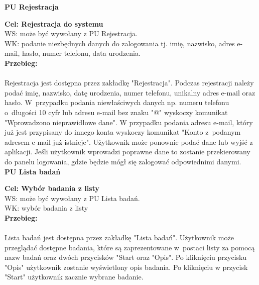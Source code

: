 \documentclass[12pt, letterpaper]{article}
\begin{document}
		
		\textbf{PU Rejestracja}
		
		\quad
		
		\textbf{Cel: Rejestracja do systemu}\\
		
		WS: może być wywołany z PU Rejestracja.\\
		
		WK: podanie niezbędnych danych do zalogowania tj. imię, nazwisko, adres e-mail, hasło, numer telefonu, data urodzenia.\\
		
		\textbf{Przebieg:}
\paragraph{}Rejestracja jest dostępna przez zakładkę "Rejestracja". Podczas rejestracji należy podać imię, nazwisko, datę urodzenia, numer telefonu, unikalny adres e-mail oraz hasło. W~przypadku podania niewłaściwych danych np. numeru telefonu o~długości 10 cyfr lub adresu e-mail bez znaku "@" wyskoczy komunikat "Wprowadzono nieprawidłowe dane". W przypadku podania adresu e-mail, który już jest przypisany do innego konta wyskoczy komunikat "Konto z~podanym adresem e-mail już istnieje". Użytkownik może ponownie podać dane lub wyjść z aplikacji. Jeśli użytkownik wprowadzi poprawne dane to zostanie przekierowany do panelu logowania, gdzie będzie mógł się zalogować odpowiednimi danymi.\\
		
		
		\textbf{PU Lista badań}
		
		\quad
		
		\textbf{Cel: Wybór badania z listy}\\
		
		WS: może być wywołany z PU Lista badań.\\
		
		WK: wybór badania z listy\\
		
		\textbf{Przebieg:}
\paragraph{}Lista badań jest dostępna przez zakładkę "Lista badań". Użytkownik może przeglądać dostępne badania, które są zaprezentowane w~postaci listy za pomocą nazw badań oraz dwóch przycisków "Start oraz "Opis". Po kliknięciu przycisku "Opis" użytkownik zostanie wyświetlony opis badania. Po kliknięciu w przycisk "Start" użytkownik zacznie wybrane badanie.\\
		
\end{document}
